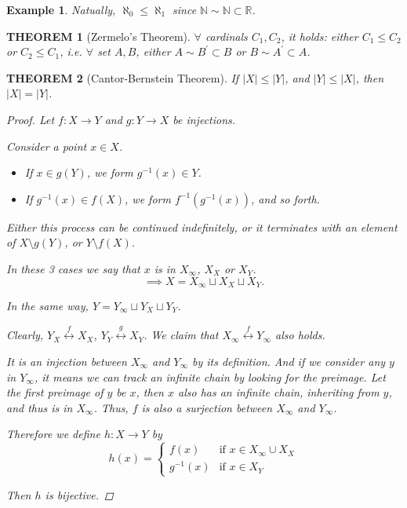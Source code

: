 \documentclass[12pt]{article}
\theoremstyle{blueplain}
\newtheorem{theorem}{THEOREM}[section]
\theoremstyle{bluedef}
\theoremstyle{blueremark}
\newtheorem{example}{Example}[section]
\newcommand{\R}{\mathbb{R}}
\newcommand{\N}{\mathbb{N}}
\numberwithin{equation}{section}
\begin{document}
      \begin{example}
        Natually, $\aleph_0 \leq \aleph_1$ since $\N \sim \N \subset \R$.
      \end{example}

      \begin{theorem}[Zermelo's Theorem]

        $\forall$ cardinals $C_1, C_2$, it holds: either $C_1 \leq C_2$ or $C_2 \leq C_1$, i.e. $\forall$ set $A, B$, either $A \sim B^{\prime} \subset B$ or $B \sim A^{\prime} \subset A$.
      \end{theorem}

      \begin{theorem}[Cantor-Bernstein Theorem]

        If $|X| \leq |Y|$, and $|Y| \leq |X|$, then $|X| = |Y|$.
        \begin{proof}
          Let $f: X \to Y$ and $g: Y \to X$ be injections.

          Consider a point $x \in X$.
          \begin{itemize}
            \item If $x \in g(Y)$, we form $g^{-1}(x) \in Y$.
            \item If $g^{-1}(x) \in f(X)$, we form $f^{-1}(g^{-1}(x))$, and so forth.
          \end{itemize}
          Either this process can be continued indefinitely, or it terminates with an element of $X \setminus g(Y)$, or $Y \setminus f(X)$.

          In these 3 cases we say that $x$ is in $X_{\infty}$, $X_X$ or $X_Y$.
          $$\implies X = X_{\infty} \sqcup X_X \sqcup X_Y.$$

          In the same way, $Y = Y_{\infty} \sqcup Y_X \sqcup Y_Y$.

          Clearly, $Y_X \stackrel{f}{\leftrightarrow} X_X$, $Y_Y \stackrel{g}{\leftrightarrow} X_Y$. We claim that $X_{\infty} \stackrel{f}{\leftrightarrow} Y_{\infty}$ also holds.

          It is an injection between $X_{\infty}$ and $Y_{\infty}$ by its definition. And if we consider any $y$ in $Y_{\infty}$, it means we can track an infinite chain by looking for the preimage. Let the first preimage of $y$ be $x$, then $x$ also has an infinite chain, inheriting from $y$, and thus is in $X_\infty$. Thus, $f$ is also a surjection between $X_{\infty}$ and $Y_{\infty}$.

          Therefore we define $h: X \to Y$ by
          $$h(x) = \begin{cases}
              f(x)      & \text{if } x \in X_{\infty} \cup X_X \\
              g^{-1}(x) & \text{if } x \in X_Y
            \end{cases}$$

          \noindent Then $h$ is bijective.
        \end{proof}
      \end{theorem}
\end{document}
